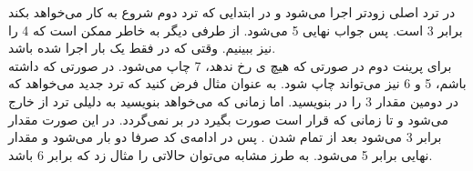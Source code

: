 \begin{itemize}
    در ترد اصلی زودتر اجرا می‌شود و
    در ابتدایی که ترد دوم شروع به کار می‌خواهد بکند برابر 3 است. پس جواب نهایی 5 می‌شود.
    از طرفی دیگر به خاطر
    ممکن است که 4 را نیز ببینیم. وقتی که در
    فقط یک بار
    اجرا شده باشد.
    \\
    برای پرینت دوم در صورتی که هیچ
    ی
    رخ ندهد، 7 چاپ می‌شود.
    در صورتی که
    داشته باشم، 5 و 6 نیز می‌تواند چاپ شود. به عنوان مثال فرض کنید که ترد جدید می‌خواهد که در دومین
    مقدار 3 را در
    بنویسید. اما زمانی که می‌خواهد بنویسید به دلیلی ترد از
    خارج می‌شود و تا زمانی که قرار است
    صورت بگیرد در
    بر نمی‌گردد. در این صورت مقدار
    برابر 3 می‌شود بعد از تمام شدن
    .
    پس در ادامه‌ی کد صرفا دو بار
    می‌شود و مقدار نهایی برابر 5 می‌شود. به طرز مشابه می‌توان حالاتی را مثال زد که
    برابر 6 باشد.
\end{itemize}
